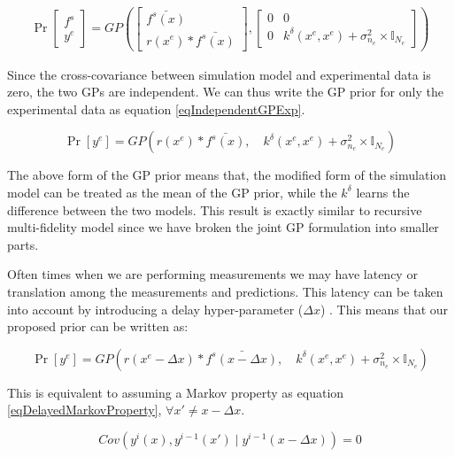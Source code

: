 \begin{align}
\Pr \begin{bmatrix}
f^{s}\\ 
y^{e}
\end{bmatrix}    = GP \left ( \begin{bmatrix}
\bar{f^{s}(x)}\\ 
r(x^{e})*\bar{f^{s}(x)}
\end{bmatrix}, \begin{bmatrix} 0 & 0   \\
           0 & k^{\delta}(x^{e}, x^{e}) + \sigma_{n_{e}}^2 \times \mathbb{I}_{N_{e}}\end{bmatrix} \right ) 
\end{align}

Since the cross-covariance between simulation model and experimental data is zero, the two GPs are independent. We can thus write the GP prior for only the experimental data as equation \ref{eqIndependentGPExp}.

\begin{equation}\label{eqIndependentGPExp}
\Pr[y^{e}] = GP \left( r(x^{e})*\bar{f^{s}(x)}, \quad k^{\delta}(x^{e}, x^{e}) + \sigma_{n_{e}}^2 \times \mathbb{I}_{N_{e}} \right)
\end{equation}

The above form of the GP prior means that, the modified form of the simulation model can be treated as the mean of the GP prior, while the $k^{\delta}$ learns the difference between the two models. This result is exactly similar to recursive multi-fidelity model \cite{gratiet2012recursive} since we have broken the joint GP formulation into smaller parts. 

Often times when we are performing measurements we may have latency or translation among the measurements and predictions. This latency can be taken into account by introducing a delay hyper-parameter ($\Delta x$) \cite{osborne2008towards}. This means that our proposed prior can be written as:

\begin{equation}\label{eqProposedGPExp}
\Pr[y^{e}] = GP \left( r(x^{e} -\Delta x )*\bar{f^{s}(x - \Delta x)}, \quad k^{\delta}(x^{e}, x^{e}) + \sigma_{n_{e}}^2 \times \mathbb{I}_{N_{e}} \right)
\end{equation}

This is equivalent to assuming a Markov property as equation \ref{eqDelayedMarkovProperty}, $\forall x' \neq x - \Delta x$.

\begin{equation}\label{eqDelayedMarkovProperty}
         Cov(y^{i}(x), y^{i-1}(x') \mid y^{i-1}(x - \Delta x)) = 0
\end{equation}


